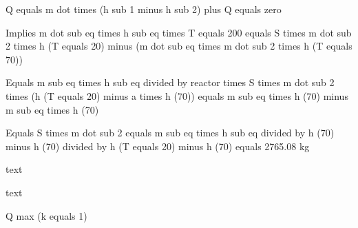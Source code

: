Q equals m dot times (h sub 1 minus h sub 2) plus Q equals zero

Implies m dot sub eq times h sub eq times T equals 200 equals S times m dot sub 2 times h (T equals 20) minus (m dot sub eq times m dot sub 2 times h (T equals 70))

Equals m sub eq times h sub eq divided by reactor times S times m dot sub 2 times (h (T equals 20) minus a times h (70)) equals m sub eq times h (70) minus m sub eq times h (70)

Equals S times m dot sub 2 equals m sub eq times h sub eq divided by h (70) minus h (70) divided by h (T equals 20) minus h (70) equals 2765.08 kg

text

text

Q max (k equals 1)